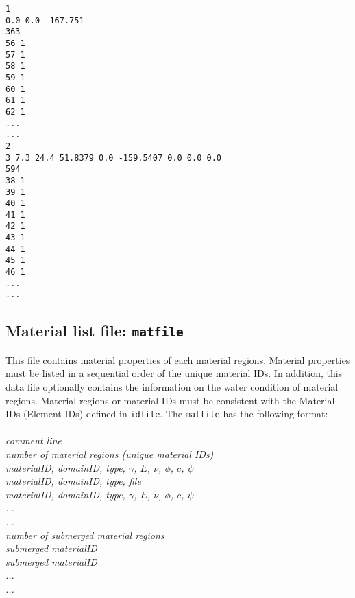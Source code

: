\texttt{1\\
0.0 0.0 -167.751\\
363\\
56 1\\
57 1\\
58 1\\
59 1\\
60 1\\
61 1\\
62 1\\
...\\
...\\
2\\
3 7.3 24.4 51.8379 0.0 -159.5407 0.0 0.0 0.0\\
594\\
38 1\\
39 1\\
40 1\\
41 1\\
42 1\\
43 1\\
44 1\\
45 1\\
46 1\\
...\\
...}\\

\subsection{Material list file: \texttt{matfile}}

This file contains material properties of each material regions. Material properties must be listed in a sequential order of the unique material IDs. In addition, this data file optionally contains the information on the water condition of material regions. Material regions or material IDs must be consistent with the Material IDs (Element IDs) defined in \texttt{idfile}. The \texttt{matfile} has the following format:\\\\

\emph{comment line}\\
\emph{number of material regions (unique material IDs)\\
materialID, domainID, type, $\gamma$, $E$, $\nu$, $\phi$, $c$, $\psi$ \\
materialID, domainID, type, file \\
materialID, domainID, type, $\gamma$, $E$, $\nu$, $\phi$, $c$, $\psi$ \\
...\\
...\\
number of submerged material regions\\
submerged materialID\\
submerged materialID\\
...\\
...\\}

